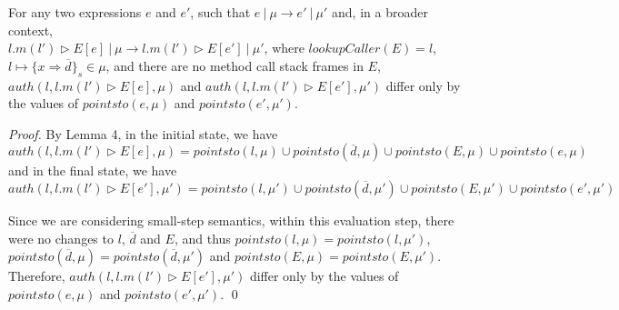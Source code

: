 \documentclass{llncs}
\begin{document}
\begin{lemma}
For any two expressions $e$ and $e'$, such that $e~|~\mu \longrightarrow e'~|~\mu'$ and, in a broader context,\\ \mbox{$l.m(l') \rhd E[e]~|~\mu \longrightarrow l.m(l') \rhd E[e']~|~\mu'$}, where $lookupCaller(E) = l$, $l \mapsto \{ x \Rightarrow \overline{d} \}_s \in \mu$, and there are no method call stack frames in $E$, $auth(l, l.m(l') \rhd E[e], \mu)$ and $auth(l, l.m(l') \rhd E[e'], \mu')$ differ only by the values of $pointsto(e, \mu)$ and $pointsto(e', \mu')$.
\end{lemma}

\begin{proof} By Lemma 4, in the initial state, we have
\[
auth(l, l.m(l') \rhd E[e], \mu) = pointsto(l, \mu) \cup pointsto(\overline{d}, \mu) \cup pointsto(E, \mu) \cup pointsto(e, \mu)
\]
and in the final state, we have
\[
auth(l, l.m(l') \rhd E[e'], \mu') = pointsto(l, \mu') \cup pointsto(\overline{d}, \mu') \cup pointsto(E, \mu') \cup pointsto(e', \mu')
\]

Since we are considering small-step semantics, within this evaluation step, there were no changes to $l$, $\overline{d}$ and $E$, and thus $pointsto(l, \mu) = pointsto(l, \mu')$, $pointsto(\overline{d}, \mu) = pointsto(\overline{d}, \mu')$ and $pointsto(E, \mu) = pointsto(E, \mu')$. Therefore, $auth(l, l.m(l') \rhd E[e'], \mu')$ differ only by the values of $pointsto(e, \mu)$ and $pointsto(e', \mu')$. \qed

\end{proof}

\newpage
\end{document}
